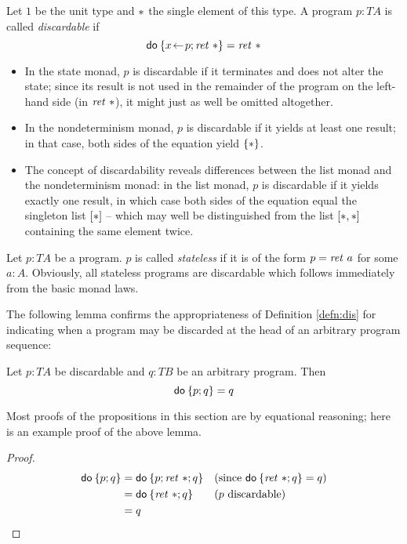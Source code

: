 \begin{defn}
  \label{defn:dis}
  Let $1$ be the unit type and $\ast$ the single element of this type. A
  program $p : T A$ is called \emph{discardable} if
  \[ \mathsf{do}\: \{x\!\gets\! p; \mathit{ret}~\ast\} = \mathit{ret}~\ast \]
  \begin{itemize}
  \item In the state monad, $p$ is discardable if it terminates and does not
    alter the state; since its result is not used in the remainder of the
    program on the left-hand side (\IE in $\mathit{ret}~\ast$), it might just as well
    be omitted altogether.
  \item In the nondeterminism monad, $p$ is discardable if it yields at least
    one result; in that case, both sides of the equation yield $\{\ast\}$.
  \item The concept of discardability reveals differences between the list monad
    and the nondeterminism monad: in the list monad, $p$ is discardable if it
    yields exactly one result, in which case both sides of the equation equal
    the singleton list $[\ast]$ -- which may well be distinguished from the
    list $[\ast, \ast]$ containing the same element twice.
  \end{itemize}
\end{defn}

\begin{defn}
  Let $p : T A$ be a program. $p$ is called \emph{stateless} if it is of the
  form $p = \mathit{ret}~a$ for some $a : A$. Obviously, all stateless programs are
  discardable which follows immediately from the basic monad laws.
\end{defn}

The following lemma confirms the appropriateness of Definition \ref{defn:dis}
for indicating when a program may be discarded at the head of an arbitrary
program sequence:
\begin{lem}
  \label{thm:dis-general}
  Let $p: T A$ be discardable and $q : T B$ be an arbitrary program. Then
  \[ \mathsf{do}\: \{p; q\} = q \]
\end{lem}
Most proofs of the propositions in this section are by equational reasoning;
here is an example proof of the above lemma.
\begin{proof}
  \begin{align*}
    \mathsf{do}\: \{p; q\} &= \mathsf{do}\: \{p; \mathit{ret}~\ast; q\}  && \text{(since
      $\mathsf{do}\: \{\mathit{ret}~\ast; q\} = q$)}\\
                  &= \mathsf{do}\: \{\mathit{ret}~\ast; q\} && \text{($p$ discardable)}\\
                  &= q
  \end{align*}
\end{proof}


